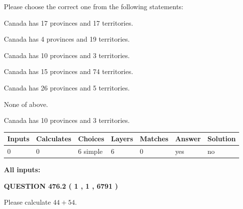 \documentclass[12pt]{article}
\begin{document}
  
Please choose the correct one from the following statements:
 
 
Canada has  17 provinces and  17 territories.
 
 
Canada has   4 provinces and  19 territories.
 
 
Canada has 10  provinces and 3 territories.
 
 
Canada has  15 provinces and  74 territories.
 
 
Canada has  26 provinces and  5 territories.
 
 
 None of above.
 
 
\noindent{}
 
 
Canada has 10  provinces and 3 territories.
 
 
\noindent{}
 
 
   
   
   
   
\noindent\begin{tabular}{|l|l|l|l|l|l|l|}
 \hline
Inputs & Calculates & Choices & Layers & Matches & Answer & Solution \\ \hline
 0  & 
 0  & 
 6
  simple  
  & 
 6  & 
 0  & 
  yes & 
  no 
  \\ \hline
 \end{tabular}
   
   
   
   
\noindent{}
   
   
   
   
\noindent\vspace{0.1in}\hspace{-0.08in} {\textbf{\Large{All inputs: }}}
   
   
  
\vspace{0.2in}
  
{\textbf{\Large{QUESTION
476.2 
 ( 1 , 1 , 6791 )
}}}
  
  
 
Please calculate $ %
44 +  %
54 $.
 
 
   
\end{document}
